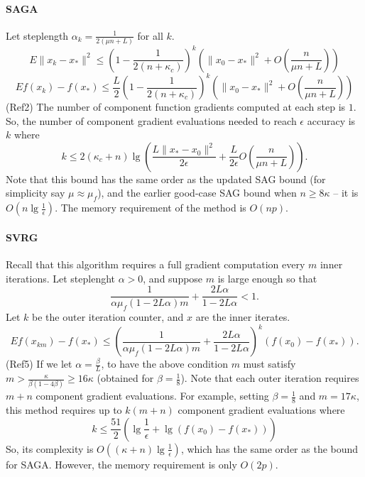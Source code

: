 \documentclass{article}
\begin{document}
\paragraph{SAGA} Let steplength $\alpha_k = \displaystyle\frac{1}{2(\mu n+L)}$ for all $k$.
 \[
  E\|x_k-x_\ast\|^2 \leq \left(1-\frac{1}{2(n + \kappa_c)}\right)^k \left(\|x_0-x_\ast\|^2 + O\left(\frac{n}{\mu n+L}\right)\right)
 \]
 \[
  Ef(x_k)-f(x_\ast) \leq \frac{L}{2}\left(1-\frac{1}{2(n + \kappa_c)}\right)^k \left(\|x_0-x_\ast\|^2 + O\left(\frac{n}{\mu n+L}\right)\right)
 \]
(Ref2) The number of component function gradients computed at each step is $1$.  So, the number of component gradient evaluations needed to reach $\epsilon$ accuracy is $k$ where
 \[
  k\leq 2(\kappa_c+n)\lg\left(\frac{L\|x_\ast-x_0\|^2}{2\epsilon}+\frac{L}{2\epsilon}O\left(\frac{n}{\mu n+L}\right)\right).
 \]
 Note that this bound has the same order as the updated SAG bound (for simplicity say $\mu\approx\mu_f$), and the earlier good-case SAG bound when $n\geq 8\kappa$ -- it is $O(n\lg \frac{1}{\epsilon})$.
 The memory requirement of the method is $O(np)$.  
 
\paragraph{SVRG}  Recall that this algorithm requires a full gradient computation every $m$ inner iterations.  Let steplenght $\alpha>0$, and suppose $m$ is large enough so that 
\[
 \frac{1}{\alpha \mu_f (1-2L\alpha)m } + \frac{2L\alpha}{1-2L\alpha} < 1. 
\]
Let $k$ be the outer iteration counter, and $x$ are the inner iterates.
\[
 Ef(x_{km})-f(x_\ast) \leq \left( \frac{1}{\alpha \mu_f (1-2L\alpha)m } + \frac{2L\alpha}{1-2L\alpha} \right)^k (f(x_0)-f(x_\ast)).
\]
(Ref5)  If we let $\alpha = \frac{\beta}{L}$, to have the above condition $m$ must satisfy $m > \frac{\kappa}{\beta(1-4\beta)} \geq 16\kappa$ (obtained for $\beta=\frac{1}{8}$).  Note that each outer iteration requires $m+n$ component gradient evaluations.  For example, setting $\beta=\frac{1}{8}$ and $m=17\kappa$, this method requires up to $k(m+n)$ component gradient evaluations where 
\[
k \leq \frac{51}{2}\left(\lg\frac{1}{\epsilon}+\lg(f(x_0)-f(x_\ast))\right) 
\]
So, its complexity is $O((\kappa+n)\lg\frac{1}{\epsilon})$, which has the same order as the bound for SAGA.  However, the memory requirement is only $O(2p)$.
\end{document}
